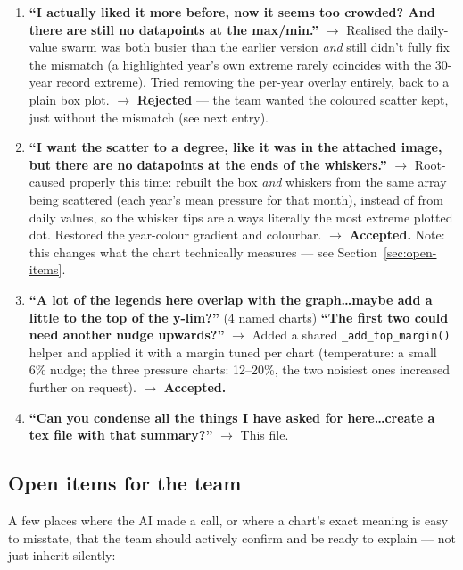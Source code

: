 \begin{enumerate}[leftmargin=*, itemsep=0.8em]
\item \label{item:pbox2} \textbf{``I actually liked it more before, now it seems too
crowded? And there are still no datapoints at the max/min.''}
$\rightarrow$ Realised the daily-value swarm was both busier than the earlier version \emph{and}
still didn't fully fix the mismatch (a highlighted year's own extreme rarely coincides with
the 30-year record extreme). Tried removing the per-year overlay entirely, back to a plain
box plot.
$\rightarrow$ \textbf{Rejected} --- the team wanted the coloured scatter kept, just without
the mismatch (see next entry).

\item \label{item:pbox3} \textbf{``I want the scatter to a degree, like it was in the
attached image, but there are no datapoints at the ends of the whiskers.''}
$\rightarrow$ Root-caused properly this time: rebuilt the box \emph{and} whiskers from the
same array being scattered (each year's mean pressure for that month), instead of from daily
values, so the whisker tips are always literally the most extreme plotted dot. Restored the
year-colour gradient and colourbar.
$\rightarrow$ \textbf{Accepted.} Note: this changes what the chart technically measures ---
see Section~\ref{sec:open-items}.

\item \textbf{``A lot of the legends here overlap with the graph\ldots maybe add a little to
the top of the y-lim?''} (4 named charts) \textbf{``The first two could need another nudge
upwards?''}
$\rightarrow$ Added a shared \texttt{\_add\_top\_margin()} helper and applied it with a margin
tuned per chart (temperature: a small 6\% nudge; the three pressure charts: 12--20\%, the two
noisiest ones increased further on request).
$\rightarrow$ \textbf{Accepted.}

\item \textbf{``Can you condense all the things I have asked for here\ldots create a tex
file with that summary?''}
$\rightarrow$ This file.

\end{enumerate}

\subsection*{Open items for the team}
\label{sec:open-items}

A few places where the AI made a call, or where a chart's exact meaning is easy to
misstate, that the team should actively confirm and be ready to explain --- not just inherit
silently:

